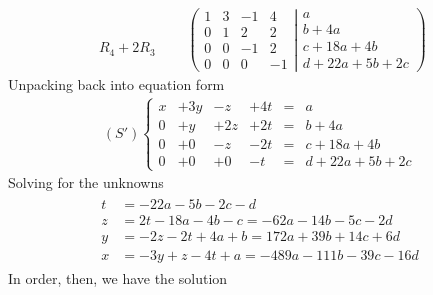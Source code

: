 \begin{align*}
\begin{array}{l}
   \\
   \\
  \\
 R_4 + 2R_3
\end{array}
&\quad
\left(
	\begin{matrix}
	   1 &   3 & -1 &   4 \\
	   0 &   1 &  2 &   2 \\
	   0 &   0 & -1 &   2 \\
	   0 &   0 &  0 &  -1
	\end{matrix}
  \left|
	\begin{matrix}
	  a \\
	  b+4a \\
	  c+18a+4b \\
	  d+22a+5b+2c
	\end{matrix}
  \right.
\right)
\end{align*}
Unpacking back into equation form
\begin{align*}
(S')
\left\{
\begin{matrix}
    x &+ 3y &-  z &+ 4t &=&  a \\
    0 &+  y &+ 2z &+ 2t &=&  b+4a \\
    0 &+  0 &-  z &- 2t &=&  c+18a+4b \\
    0 &+  0 &+  0 &-  t &=&  d+22a+5b+2c
\end{matrix}
\right.
\end{align*}
Solving for the unknowns
\begin{align*}
\begin{array}{ll}
   t &=  -22a-5b-2c -d\\
   z &=  2t -18a-4b-c  = -62a-14b-5c-2d\\
   y &=  -2z - 2t +4a+b = 172a+39b+14c+6d\\
   x &= -3y + z - 4t + a = -489a - 111b-39c-16d 	
\end{array}
\end{align*}
In order, then, we have the solution
